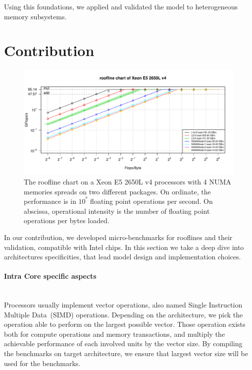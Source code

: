 \documentclass[twoside,twocolumn,8pt]{extarticle}
\begin{document}
Using this foundations, we applied and validated the model to heterogeneous memory subsystems.

\section{Contribution}\label{sec:contrib}
\begin{figure}
  \centering
  \includegraphics[width=\textwidth]{pictures/roofline_model}
  \caption{The roofline chart on a Xeon E5 2650L v4 processors with 4 NUMA memories spreads on two different packages. On ordinate, the performance is in $10^{^9}$ floating point operations per second. On abscissa, operational intensity is the number of floating point operations per bytes loaded.}
  \label{fig:orig_model}
\end{figure}

In our contribution, we developed micro-benchmarks for rooflines and their validation, compatible with Intel chips.
In this section we take a deep dive into architectures specificities, that lead model design and implementation choices.

\paragraph{Intra Core specific aspects}\mbox{}\\

Processors usually implement vector operations, also named Single Instruction Multiple Data~(SIMD) operations.
Depending on the architecture, we pick the operation able to perform on the largest possible vector. Those operation exists
both for compute operations and memory transactions, and multiply the achievable performance of each involved units by the vector
size. By compiling the benchmarks on target architecture, we ensure that largest vector size will be used for the benchmarks.
\end{document}
